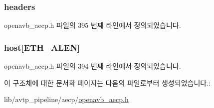 \subsubsection[{\texorpdfstring{headers}{headers}}]{ headers}\hypertarget{structopenavb__aecp___a_e_m_command_response__t_a16afa0982cfd4ce9cdd5bda28d6cebe2}{}\label{structopenavb__aecp___a_e_m_command_response__t_a16afa0982cfd4ce9cdd5bda28d6cebe2}


openavb\+\_\+aecp.\+h 파일의 395 번째 라인에서 정의되었습니다.

\subsubsection[{\texorpdfstring{host}{host}}]{ host\mbox{[}{\bf E\+T\+H\+\_\+\+A\+L\+EN}\mbox{]}}\hypertarget{structopenavb__aecp___a_e_m_command_response__t_af49630bd03e5ae4979e6213e3793876e}{}\label{structopenavb__aecp___a_e_m_command_response__t_af49630bd03e5ae4979e6213e3793876e}


openavb\+\_\+aecp.\+h 파일의 394 번째 라인에서 정의되었습니다.



이 구조체에 대한 문서화 페이지는 다음의 파일로부터 생성되었습니다.\+:\begin{DoxyCompactItemize}
\item 
lib/avtp\+\_\+pipeline/aecp/\hyperlink{openavb__aecp_8h}{openavb\+\_\+aecp.\+h}\end{DoxyCompactItemize}
